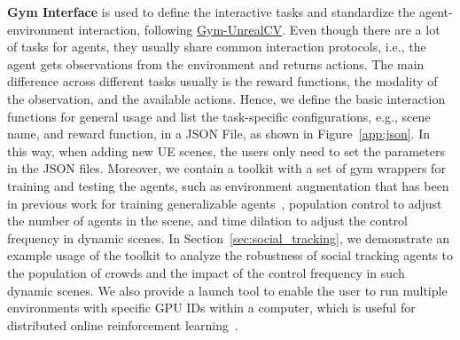 \documentclass{article}
\begin{document}
\begin{table}[tb]
\centering

\caption{Comparison of FPS in Unreal Engine 4.27 with UnrealCV and UnrealCV+. The reported result is an average performance across 6 typical environments.}
\label{tab:fps_image}
\vspace{-0.3cm}
\end{table}

\textbf{Gym Interface} is used to define the interactive tasks and standardize the agent-environment interaction, following \href{https://github.com/zfw1226/gym-unrealcv}{Gym-UnrealCV}.
Even though there are a lot of tasks for agents, they usually share common interaction protocols, i.e., the agent gets observations from the environment and returns actions. The main difference across different tasks usually is the reward functions, the modality of the observation, and the available actions. Hence, we define the basic interaction functions for general usage and list the task-specific configurations, e.g., scene name, and reward function, in a JSON File, as shown in Figure~\ref{app:json}. In this way, when adding new UE scenes, the users only need to set the parameters in the JSON files. Moreover, we contain a toolkit with a set of gym wrappers for training and testing the agents, such as environment augmentation that has been in previous work for training generalizable agents~\citep{luo2018end, luo2019pami}, population control to adjust the number of agents in the scene, and time dilation to adjust the control frequency in dynamic scenes. In Section~\ref{sec:social_tracking}, we demonstrate an example usage of the toolkit to analyze the robustness of social tracking agents to the population of crowds and the impact of the control frequency in such dynamic scenes. We also provide a launch tool to enable the user to run multiple environments with specific GPU IDs within a computer, which is useful for distributed online reinforcement learning~\citep{ci2023proactive}.
\end{document}
